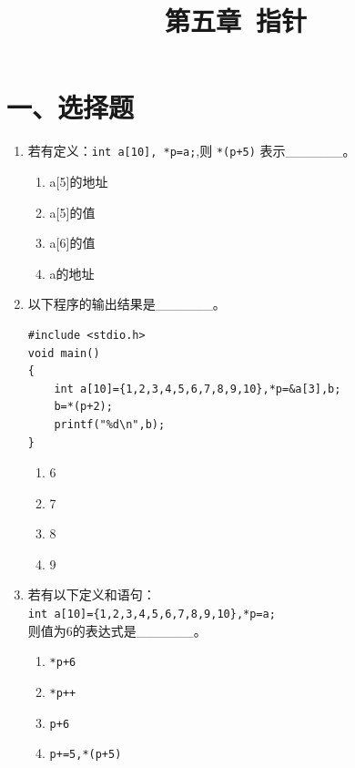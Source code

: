 \documentclass[a4paper,12pt]{article}
\title{\textbf{第五章\ 指针}}
\author{}
\date{}
\begin{document}
\maketitle

\section*{一、选择题}

\begin{enumerate}
	\item 若有定义：\texttt{int a[10], *p=a;},则 \texttt{*(p+5)} 表示\_\_\_\_\_\_。
	      \begin{enumerate}
		      \item[A)] a[5]的地址
		      \item[B)] a[5]的值
		      \item[C)] a[6]的值
		      \item[D)] a的地址
	      \end{enumerate}
	      \vspace{0.3cm}

	\item 以下程序的输出结果是\_\_\_\_\_\_。
	      \begin{verbatim}
#include <stdio.h>
void main()
{
    int a[10]={1,2,3,4,5,6,7,8,9,10},*p=&a[3],b;
    b=*(p+2);
    printf("%d\n",b);
}
    \end{verbatim}
	      \begin{enumerate}
		      \item[A)] 6
		      \item[B)] 7
		      \item[C)] 8
		      \item[D)] 9
	      \end{enumerate}
	      \vspace{0.3cm}

	\item 若有以下定义和语句：\\
	      \texttt{int a[10]=\{1,2,3,4,5,6,7,8,9,10\},*p=a;}\\
	      则值为6的表达式是\_\_\_\_\_\_。
	      \begin{enumerate}
		      \item[A)] \texttt{*p+6}
		      \item[B)] \texttt{*p++}
		      \item[C)] \texttt{p+6}
		      \item[D)] \texttt{p+=5,*(p+5)}
	      \end{enumerate}
	      \vspace{0.3cm}


\end{enumerate}
\end{document}
